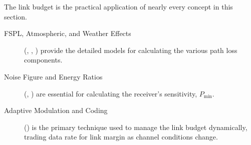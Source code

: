 \begin{importantbox}[title={Further Reading}]
    The link budget is the practical application of nearly every concept in this section.
    \begin{description}
        \item[FSPL, Atmospheric, and Weather Effects] (, , ) provide the detailed models for calculating the various path loss components.
        \item[Noise Figure and Energy Ratios] (, ) are essential for calculating the receiver's sensitivity, $P_{\text{min}}$.
        \item[Adaptive Modulation and Coding] () is the primary technique used to manage the link budget dynamically, trading data rate for link margin as channel conditions change.
    \end{description}
\end{importantbox}
